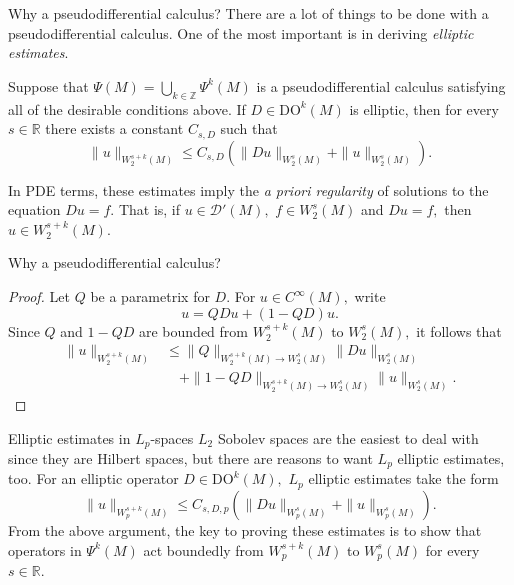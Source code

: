\documentclass{beamer}
\numberwithin{equation}{section}
\theoremstyle{plain}
\theoremstyle{plain}
\theoremstyle{definition}
\theoremstyle{plain}
\theoremstyle{plain}
\theoremstyle{definition}
\newcommand{\Rl}{\mathbb{R}}
\newcommand{\Itgr}{\mathbb{Z}}
\newcommand{\Dc}{\mathcal{D}}
\begin{document}
\begin{frame}{Why a pseudodifferential calculus?}
  There are a lot of things to be done with a pseudodifferential calculus. One of the most important is in deriving \emph{elliptic estimates}.
  \begin{lemma}
    Suppose that $\Psi(M) = \bigcup_{k\in \Itgr} \Psi^k(M)$ is a pseudodifferential calculus satisfying all of the desirable conditions above. If $D\in \mathrm{DO}^k(M)$ is elliptic, then for every $s \in \Rl$ there exists a constant $C_{s,D}$ such that
    \[
      \|u\|_{W^{s+k}_2(M)} \leq C_{s,D}(\|Du\|_{W^s_2(M)} + \|u\|_{W^{s}_2(M)}).
    \]
  \end{lemma}
  \pause
  In PDE terms, these estimates imply the \emph{a priori regularity} of solutions to the equation $Du=f.$ That is, if $u\in \Dc'(M),$ $f \in W^s_2(M)$ and $Du=f,$ then $u\in W^{s+k}_2(M).$
\end{frame}
\begin{frame}{Why a pseudodifferential calculus?}
  \begin{proof}
    Let $Q$ be a parametrix for $D.$ For $u\in C^\infty(M),$ write
    \[
        u = QDu+(1-QD)u.
    \]  
    \pause
    Since $Q$ and $1-QD$ are bounded from $W^{s+k}_2(M)$ to $W^{s}_2(M),$ it follows that
    \begin{align*}
        \|u\|_{W^{s+k}_2(M)} &\leq \|Q\|_{W^{s+k}_2(M)\to W^s_2(M)}\|Du\|_{W^s_2(M)}\\
        &\quad +\|1-QD\|_{W^{s+k}_2(M)\to W^s_2(M)}\|u\|_{W^s_2(M)}.
    \end{align*}
  \end{proof}
\end{frame}

\begin{frame}{Elliptic estimates in $L_p$-spaces}
    $L_2$ Sobolev spaces are the easiest to deal with since they are Hilbert spaces, but there are reasons to want $L_p$ elliptic estimates, too. For an elliptic operator $D\in \mathrm{DO}^k(M),$ $L_p$ elliptic estimates take the form
    \[
        \|u\|_{W^{s+k}_p(M)} \leq C_{s,D,p}(\|Du\|_{W^{s}_p(M)}+\|u\|_{W^{s}_p(M)}).
    \]
    \pause
    From the above argument, the key to proving these estimates is to show that operators in $\Psi^k(M)$ act boundedly from $W^{s+k}_p(M)$
    to $W^{s}_p(M)$ for every $s\in \Rl.$
\end{frame}
\end{document}
